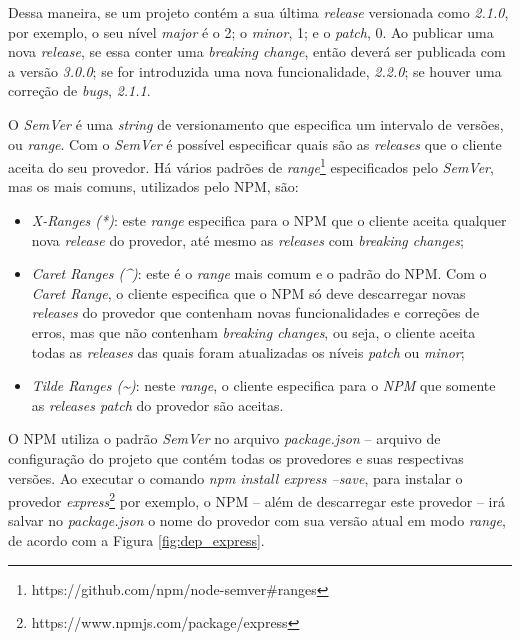 Dessa maneira, se um projeto contém a sua última \textit{release} versionada como \textit{2.1.0}, por exemplo, o seu nível \textit{major} é o 2; o \textit{minor}, 1; e o \textit{patch}, 0. Ao publicar uma nova \textit{release}, se essa conter uma \textit{breaking change}, então deverá ser publicada com a versão \textit{3.0.0}; se for introduzida uma nova funcionalidade, \textit{2.2.0}; se houver uma correção de \textit{bugs}, \textit{2.1.1}.

O \textit{SemVer} é uma \textit{string} de versionamento que especifica um intervalo de versões, ou \textit{range}. Com o \textit{SemVer} é possível especificar quais são as \textit{releases} que o cliente aceita do seu provedor. Há vários padrões de \textit{range}\footnote{https://github.com/npm/node-semver\#ranges} especificados pelo \textit{SemVer}, mas os mais comuns, utilizados pelo \gls{NPM}, são:

\begin{itemize}
    \item \textit{X-Ranges (*)}: este \textit{range} especifica para o \gls{NPM} que o cliente aceita qualquer nova \textit{release} do provedor, até mesmo as \textit{releases} com \textit{breaking changes};
    \item \textit{Caret Ranges (\textasciicircum)}: este é o \textit{range} mais comum e o padrão do \gls{NPM}. Com o \textit{Caret Range}, o cliente especifica que o \gls{NPM} só deve descarregar novas \textit{releases} do provedor que contenham novas funcionalidades e correções de erros, mas que não contenham \textit{breaking changes}, ou seja, o cliente aceita todas as \textit{releases} das quais foram atualizadas os níveis \textit{patch} ou \textit{minor};
    \item \textit{Tilde Ranges (\textasciitilde)}: neste \textit{range}, o cliente especifica para o \textit{NPM} que somente as \textit{releases patch} do provedor são aceitas.
\end{itemize}{}

O \gls{NPM} utiliza o padrão \textit{SemVer} no arquivo \textit{package.json} -- arquivo de configuração do projeto que contém todas os provedores e suas respectivas versões. Ao executar o comando \textit{npm install express --save}, para instalar o provedor \textit{express}\footnote{https://www.npmjs.com/package/express} por exemplo, o \gls{NPM} -- além de descarregar este provedor -- irá salvar no \textit{package.json} o nome do provedor com sua versão atual em modo \textit{range}, de acordo com a Figura \ref{fig:dep_express}.

